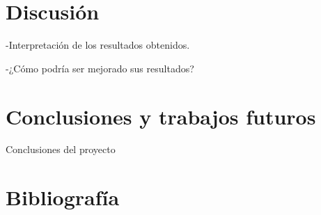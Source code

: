 \documentclass[twocolumn]{article}
\begin{document}

\section{Discusión}

-Interpretación de los resultados obtenidos.

-¿Cómo podría ser mejorado sus resultados?






\section{Conclusiones y trabajos futuros}
Conclusiones del proyecto
\section{Bibliografía}

%
\nocite{*}



\end{document}
